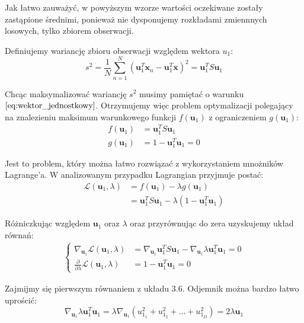 \documentclass[oneside, eng]{mgr}
\newcommand{\bb}{\textbf}
\begin{document}
Jak łatwo zauważyć, w powyższym wzorze wartości oczekiwane zostały zastąpione średnimi, ponieważ nie dysponujemy rozkładami zmiennnych losowych, tylko zbiorem obserwacji.

Definiujemy wariancję zbioru obserwacji względem wektora $u_1$:
\begin{equation}
	s^2 = \frac{1}{N} \sum_{n=1}^{N}(\bb{u}_1^T \bb{x}_n - \bb{u}_1^T\overline{\bb{x}})^2 = \bb{u}_1^T S \bb{u}_1
\end{equation}

Chcąc maksymalizować wariancję $s^2$ musimy pamiętać o warunku $\ref{eq:wektor_jednostkowy}$. Otrzymujemy więc problem optymalizacji polegający na znalezieniu maksimum warunkowego funkcji $f(\bb{u}_1)$ z ograniczeniem $g(\bb{u}_1)$:
\begin{align*}
	f(\bb{u}_1) &= \bb{u}_1^T S \bb{u}_1 \\
	g(\bb{u}_1) &= 1 - \bb{u}_1^T \bb{u}_1 = 0
\end{align*}

Jest to problem, który można łatwo rozwiązać z wykorzystaniem mnożników Lagrange'a. W analizowanym przypadku Lagrangian przyjmuje postać:
\begin{align*}
	\mathcal{L}(\bb{u}_1, \lambda) &= f(\bb{u}_1) - \lambda g(\bb{u}_1) \\
				&= \bb{u}_1^T S \bb{u}_1 - \lambda(1 - \bb{u}_1^T \bb{u}_1)
\end{align*}

Różniczkując względem $\bb{u}_1$ oraz $\lambda$ oraz przyrównując do zera uzyskujemy układ równań:
\begin{align} 
\begin{cases}
	\nabla_{\bb{u}_1} \mathcal{L} (\bb{u}_1, \lambda) &= \nabla_{\bb{u}_1} \bb{u}_1^T S \bb{u}_1 - \nabla_{\bb{u}_1} \lambda \bb{u}_1^T \bb{u}_1 = 0 \\
	\frac{\partial}{\partial \lambda} \mathcal{L} (\bb{u}_1, \lambda) &= 1 - \bb{u}_1^T \bb{u}_1 = 0
\end{cases}
\end{align}

Zajmijmy się pierwszym równaniem z układu $3.6$. Odjemnik można bardzo łatwo uprościć:
\begin{equation}
	\nabla_{\bb{u}_1} \lambda \bb{u}_1^T \bb{u}_1 = \lambda \nabla_{\bb{u}_1} 
		(u_{1_1}^2 + u_{1_2}^2 + ... + u_{1_D}^2)
	 	= 2 \lambda \bb{u}_1
\end{equation}
\end{document}
